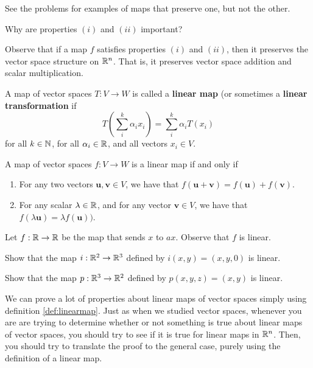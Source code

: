See the problems  for examples of maps that preserve one, but not the other.

\begin{motivating}
Why are properties $(i)$ and $(ii)$ important?
\end{motivating}

Observe that if a map $f$ satisfies properties $(i)$ and $(ii)$, then it preserves the vector space structure on $\mathbb{R}^n$.  That is, it preserves vector space addition and scalar multiplication.


\begin{definition}\label{def:linearmap}
A map of vector spaces $T : V \to W$ is called a \textbf{linear map} (or sometimes a \textbf{linear transformation} if $$T \left(\sum_i^k \alpha_i x_i\right) = \sum_i^k \alpha_i T(x_i)$$
for all $k \in \mathbb{N}$, for all $\alpha_i \in \mathbb{R}$, and all vectors $x_i \in V$.
\end{definition}

\begin{proposition}
A map of vector spaces $f: V \to W$ is a linear map if and only if 

\begin{enumerate}[label=(\roman*)]
        \item For any two vectors $\bm{u}, \bm{v} \in V$, we have that $f(\bm{u}+ \bm{v}) = f(\bm{u}) + f(\bm{v})$.
        \item For any scalar $\lambda \in \mathbb{R}$, and for any vector $\bm{v} \in V$, we have that $f(\lambda \bm{u}) = \lambda f(\bm{u}))$.
    \end{enumerate}
\end{proposition}

\begin{example}\label{multbyaislinear}
    Let $f: \mathbb{R} \to \mathbb{R}$ be the map that sends $x$ to $ax$. Observe that $f$ is linear.
\end{example}

\begin{example}
Show that the map $i: \mathbb{R}^2 \to \mathbb{R}^3$ defined by $i(x,y) = (x,y,0)$ is linear.
\end{example}

\begin{example}
Show that the map $p: \mathbb{R}^3 \to \mathbb{R}^2$ defined by $p(x,y,z) = (x,y)$ is linear.
\end{example}

We can prove a lot of properties about linear maps of vector spaces simply using definition \ref{def:linearmap}.  Just as when we studied vector spaces, whenever you are are trying to determine whether or not something is true about linear maps of vector spaces, you should try to see if it is true for linear maps in $\mathbb{R}^n$.  Then, you should try to translate the proof to the general case, purely using the definition of a linear map.

